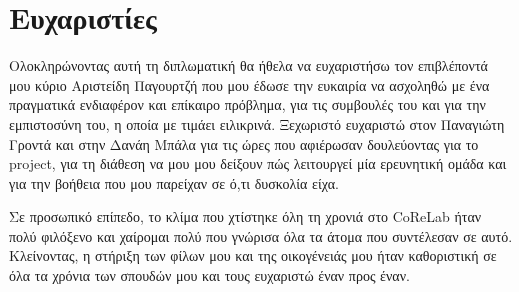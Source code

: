 \newpage
\chapter*{Ευχαριστίες}

Ολοκληρώνοντας αυτή τη διπλωματική θα ήθελα να ευχαριστήσω τον επιβλέποντά μου κύριο Αριστείδη Παγουρτζή που μου έδωσε την ευκαιρία να ασχοληθώ με ένα πραγματικά ενδιαφέρον και επίκαιρο πρόβλημα, για τις συμβουλές του και για την εμπιστοσύνη του, η οποία με τιμάει ειλικρινά. Ξεχωριστό ευχαριστώ στον Παναγιώτη Γροντά και στην Δανάη Μπάλα για τις ώρες που αφιέρωσαν δουλεύοντας για το project, για τη διάθεση να μου μου δείξουν πώς λειτουργεί μία ερευνητική ομάδα και για την βοήθεια που μου παρείχαν σε ό,τι δυσκολία είχα. 

Σε προσωπικό επίπεδο, το κλίμα που χτίστηκε όλη τη χρονιά στο CoReLab ήταν πολύ φιλόξενο και χαίρομαι πολύ που γνώρισα όλα τα άτομα που συντέλεσαν σε αυτό. Κλείνοντας, η στήριξη των φίλων μου και της οικογένειάς μου ήταν καθοριστική σε όλα τα χρόνια των σπουδών μου και τους ευχαριστώ έναν προς έναν.